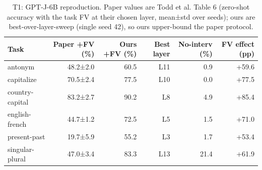 \begin{table}[t]
\centering
\small
\begin{tabular}{lrrrrr}
\toprule
Task & Paper +FV (\%) & Ours +FV (\%) & Best layer & No-interv (\%) & FV effect (pp) \\
\midrule
antonym & 48.2±2.0 & 60.5 & L11 & 0.9 & +59.6 \\
capitalize & 70.5±2.4 & 77.5 & L10 & 0.0 & +77.5 \\
country-capital & 83.2±2.7 & 90.2 & L8 & 4.9 & +85.4 \\
english-french & 44.7±1.2 & 72.5 & L5 & 1.5 & +71.0 \\
present-past & 19.7±5.9 & 55.2 & L3 & 1.7 & +53.4 \\
singular-plural & 47.0±3.4 & 83.3 & L13 & 21.4 & +61.9 \\
\bottomrule
\end{tabular}
\caption{T1: GPT-J-6B reproduction. Paper values are Todd et al. Table 6 (zero-shot accuracy with the task FV at their chosen layer, mean±std over seeds); ours are best-over-layer-sweep (single seed 42), so ours upper-bound the paper protocol.}
\label{tab:T1_gptj_reproduction}
\end{table}
